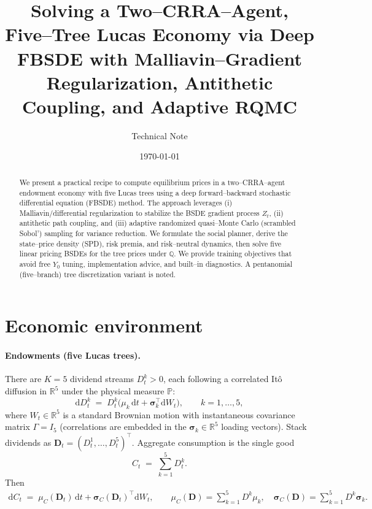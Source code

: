 \documentclass[11pt]{article}
\title{Solving a Two--CRRA--Agent, Five--Tree Lucas Economy via Deep FBSDE with Malliavin--Gradient Regularization, Antithetic Coupling, and Adaptive RQMC}
\author{Technical Note}
\date{\today}
\newcommand{\1}{\mathbbm{1}}
\newcommand{\R}{\mathbb{R}}
\newcommand{\dd}{\mathrm{d}}
\newcommand{\bs}{\boldsymbol}
\begin{document}
\maketitle

\begin{abstract}
We present a practical recipe to compute equilibrium prices in a two--CRRA--agent endowment economy with five Lucas trees using a deep forward--backward stochastic differential equation (FBSDE) method. The approach leverages (i) Malliavin/differential regularization to stabilize the BSDE gradient process \(Z_t\), (ii) antithetic path coupling, and (iii) adaptive randomized quasi--Monte Carlo (scrambled Sobol') sampling for variance reduction. We formulate the social planner, derive the state--price density (SPD), risk premia, and risk--neutral dynamics, then solve five linear pricing BSDEs for the tree prices under \(\mathbb{Q}\). We provide training objectives that avoid free \(Y_0\) tuning, implementation advice, and built--in diagnostics. A pentanomial (five--branch) tree discretization variant is noted.
\end{abstract}

\section{Economic environment}\label{sec:model}
\paragraph{Endowments (five Lucas trees).}
There are \(K=5\) dividend streams \(D^k_t>0\), each following a correlated Itô diffusion in \(\R^5\) under the physical measure \(\mathbb{P}\):
\begin{equation}\label{eq:div-diffusions}
  \dd D^k_t \;=\; D^k_t\Big( \mu_k\,\dd t + \bs\sigma_k^\top \dd W_t\Big), 
  \qquad k=1,\dots,5,
\end{equation}
where \(W_t\in\R^5\) is a standard Brownian motion with instantaneous covariance matrix \(\Gamma = I_5\) (correlations are embedded in the \(\bs\sigma_k\in\R^5\) loading vectors). Stack dividends as \(\bs D_t=(D^1_t,\dots,D^5_t)^\top\). Aggregate consumption is the single good
\begin{equation}
  C_t \;=\; \sum_{k=1}^5 D^k_t .
\end{equation}
Then
\begin{align}
  \dd C_t \;=\; \mu_C(\bs D_t)\,\dd t + \bs\sigma_C(\bs D_t)^\top \dd W_t,\qquad
  \mu_C(\bs D) = \sum_{k=1}^5 D^k \mu_k,\quad
  \bs\sigma_C(\bs D) = \sum_{k=1}^5 D^k \bs\sigma_k .
\end{align}
\end{document}
